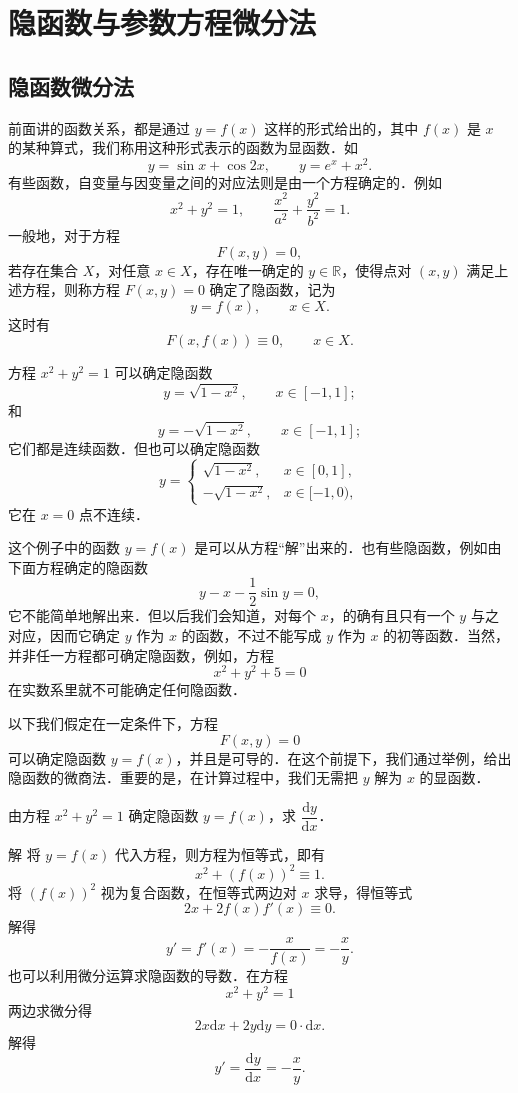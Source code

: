\section{隐函数与参数方程微分法}\label{sec:4.3}

\subsection{隐函数微分法}

前面讲的函数关系，都是通过 $y=f(x)$ 这样的形式给出的，其中 $f(x)$ 是 $x$ 的某种算式，我们称用这种形式表示的函数为显函数．如
\[
y=\sin x+\cos 2x,\qquad y=e^{x}+x^{2}.
\]
有些函数，自变量与因变量之间的对应法则是由一个方程确定的．例如
\[
x^{2}+y^{2}=1,\qquad\frac{x^{2}}{a^{2}}+\frac{y^{2}}{b^{2}}=1.
\]
一般地，对于方程
\[
F(x,y)=0,
\]
若存在集合 $X$，对任意 $x\in X$，存在唯一确定的 $y\in\mathbb{R}$，使得点对 $(x,y)$ 满足上述方程，则称方程 $F(x,y)=0$ 确定了隐函数，记为
\[
y=f(x),\qquad x\in X.
\]
这时有
\[
F(x,f(x))\equiv0,\qquad x\in X.
\]

\begin{example}\label{ex:4-3-1}
方程 $x^{2}+y^{2}=1$ 可以确定隐函数
\[
y=\sqrt{1-x^{2}},\qquad x\in[-1,1];
\]
和
\[
y=-\sqrt{1-x^{2}},\qquad x\in[-1,1];
\]
它们都是连续函数．但也可以确定隐函数
\[
y=\begin{cases}\sqrt{1-x^{2}}, & x\in[0,1],\\ -\sqrt{1-x^{2}}, & x\in[-1,0),\end{cases}
\]
它在 $x=0$ 点不连续．
\end{example}

这个例子中的函数 $y=f(x)$ 是可以从方程``解''出来的．也有些隐函数，例如由下面方程确定的隐函数
\[
y-x-\frac{1}{2}\sin y=0,
\]
它不能简单地解出来．但以后我们会知道，对每个 $x$，的确有且只有一个 $y$ 与之对应，因而它确定 $y$ 作为 $x$ 的函数，不过不能写成 $y$ 作为 $x$ 的初等函数．当然，并非任一方程都可确定隐函数，例如，方程
\[
x^{2}+y^{2}+5=0
\]
在实数系里就不可能确定任何隐函数．

以下我们假定在一定条件下，方程
\[
F(x,y)=0
\]
可以确定隐函数 $y=f(x)$，并且是可导的．在这个前提下，我们通过举例，给出隐函数的微商法．重要的是，在计算过程中，我们无需把 $y$ 解为 $x$ 的显函数．

\begin{example}\label{ex:4-3-2}
由方程 $x^{2}+y^{2}=1$ 确定隐函数 $y=f(x)$，求 $\dfrac{\mathrm{d}y}{\mathrm{d}x}$．

解 将 $y=f(x)$ 代入方程，则方程为恒等式，即有
\[
x^{2}+\left(f(x)\right)^{2}\equiv1.
\]
将 $(f(x))^{2}$ 视为复合函数，在恒等式两边对 $x$ 求导，得恒等式
\[
2x+2f(x)f'(x)\equiv0.
\]
解得
\[
y'=f'(x)=-\frac{x}{f(x)}=-\frac{x}{y}.
\]
也可以利用微分运算求隐函数的导数．在方程
\[
x^{2}+y^{2}=1
\]
两边求微分得
\[
2x\mathrm{d}x+2y\mathrm{d}y=0\cdot\mathrm{d}x.
\]
解得
\[
y'=\frac{\mathrm{d}y}{\mathrm{d}x}=-\frac{x}{y}.
\]
\end{example}

